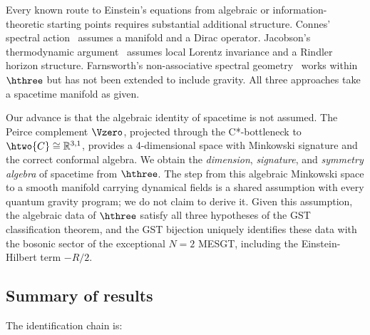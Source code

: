 Every known route to Einstein's equations from algebraic or information-theoretic
starting points requires substantial additional structure. Connes'
spectral action~\cite{ChamseddineConnes1997} assumes a manifold and a
Dirac operator. Jacobson's thermodynamic argument~\cite{Jacobson1995}
assumes local Lorentz invariance and a Rindler horizon structure.
Farnsworth's non-associative spectral geometry~\cite{Farnsworth2025}
works within $\hthree$ but has not been extended to include gravity.
All three approaches take a spacetime manifold as given.

Our advance is that the algebraic identity of spacetime is not assumed.
The Peirce complement $\Vzero$, projected through the C*-bottleneck to
$\htwo{C} \cong \mathbb{R}^{3,1}$, provides a 4-dimensional space with
Minkowski signature and the correct conformal algebra. We obtain the
\emph{dimension}, \emph{signature}, and \emph{symmetry algebra} of
spacetime from $\hthree$. The step from this algebraic Minkowski space
to a smooth manifold carrying dynamical fields is a shared assumption
with every quantum gravity program; we do not claim to derive it.
Given this assumption, the algebraic data of $\hthree$ satisfy all
three hypotheses of the GST classification theorem, and the GST
bijection uniquely identifies these data with the bosonic sector of
the exceptional $N{=}2$ MESGT, including the Einstein-Hilbert
term $-R/2$.

\subsection{Summary of results}

The identification chain is:

